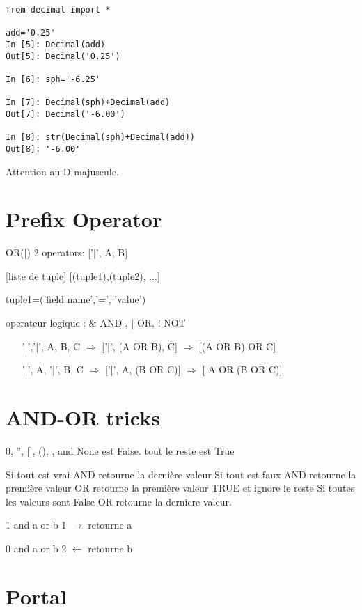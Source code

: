 \documentclass[12pt,a4paper]{article}
\begin{document}
\begin{verbatim}
from decimal import *

add='0.25'
In [5]: Decimal(add)
Out[5]: Decimal('0.25')

In [6]: sph='-6.25'

In [7]: Decimal(sph)+Decimal(add)
Out[7]: Decimal('-6.00')

In [8]: str(Decimal(sph)+Decimal(add))
Out[8]: '-6.00'
\end{verbatim}


Attention au D majuscule. 

\section{Prefix Operator}
\label{sec:prefix_op}

OR(|) 2 operators: ['|', A, B]

[liste de tuple] [(tuple1),(tuple2), ...]

tuple1=('field name','=', 'value')

operateur logique : \& AND , | OR, ! NOT  

\begin{enumerate}
\item ['|','|', A, B, C] $\Longrightarrow$ ['|', (A OR B), C] $\Longrightarrow$ [(A OR B) OR C]
\item ['|', A, '|', B, C] $\Longrightarrow$ ['|', A, (B OR C)] $\Longrightarrow$ [ A OR (B OR C)]
\end{enumerate}

\section{AND-OR tricks}
\label{sec:andor}

0, '', [], (), {}, and None est False.
tout le reste est True

Si tout est vrai AND retourne la dernière valeur
Si tout est faux AND retourne la première valeur
OR retourne la première valeur TRUE et ignore le reste
Si toutes les valeurs sont False OR retourne la derniere valeur.

1 and a or b 1 $\rightarrow$ retourne a 

0 and a or b 2 $\leftarrow$ retourne b 



\section{Portal}
\label{sec:portal}
\end{document}
